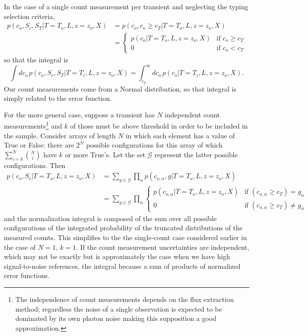 \documentclass[preprint,3p]{elsarticle}
\begin{document}
In the case of a single count measurement per transient and neglecting the typing selection criteria,
\begin{align}
 p(c_o, S_c, S_T | T=T_o, L, z=z_o, X) &=  p(c_o, c_o \ge  c_T | T=T_o, L, z=z_o, X) \\
 &= \begin{cases}
   p(c_o | T=T_o, L, z=z_o, X) & \text{if } c_o \ge c_T \\
   0 & \text{if }  c_o < c_T
 \end{cases}
\end{align}
so that the integral is
\begin{equation}
\int dc_o \, p(c_o,S_c, S_T | T=T_i, L, z=z_o, X) = \int_{c_T}^\infty dc_o\,  p(c_o | T=T_i, L, z=z_o, X).
\end{equation}
Our count measurements come from a Normal distribution, so that integral is simply related to the error function.

For the more general case, suppose a transient has $N$ independent count measurements\footnote{The independence of count measurements  depends on the flux extraction method; regardless the
noise of a single observation is expected to be dominated by its own photon noise making this
supposition a good approximation.} and $k$ of those must be above threshold in order to be
included in the sample.
Consider arrays of length $N$ in which each element has a value of True or False: there are $2^N$ possible configurations for this array
of which $\sum_{i=k}^N {N \choose i}$ have $k$ or more True's.  Let the set $\mathcal{G}$ represent the latter possible configurations.
Then
\begin{align}
p(c_o, S_c| T=T_o, L, z=z_o, X) &= \sum_{g \in \mathcal{G}} \prod_{\alpha} p(c_{o, \alpha}, g | T=T_o, L, z=z_o, X)\\
 &=  \sum_{g \in \mathcal{G}}  \prod_{\alpha} \begin{cases}
   p(c_{o,\alpha} | T=T_o, L, z=z_o, X) & \text{if } (c_{o,\alpha} \ge c_T) = g_\alpha\\
   0 & \text{if }  (c_{o,\alpha} \ge c_T)  \ne g_\alpha
 \end{cases}
\end{align}
and the normalization integral is composed of the sum over all possible configurations of the integrated probability of the truncated distributions
of the measured counts.  This simplifies to the the single-count case considered earlier in the case of $N=1$, $k=1$.
If the count measurement uncertainties are independent, which may not be exactly but is approximately the case when we have high
signal-to-noise references, the integral because a sum of products of normalized error functions.
\end{document}
